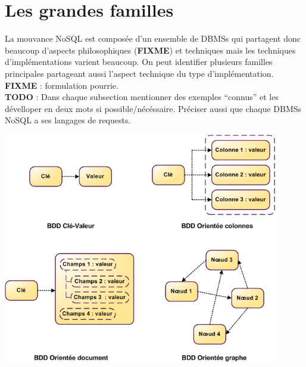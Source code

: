 \documentclass[11pt]{article}
\begin{document}
\section{Les grandes familles} %
La mouvance NoSQL est composée d'un ensemble de DBMSs qui partagent donc beaucoup d'aspects philosophiques (\textbf{FIXME}) et techniques mais les techniques d'implémentations varient beaucoup. On peut identifier plusieurs familles principales partageant aussi l'aspect technique du type d'implémentation. \textbf{FIXME} : formulation pourrie. \\
\textbf{TODO} : Dans chaque subsection mentionner des exemples ``connus'' et les dévelloper en deux mots si possible/nécéssaire. Préciser aussi que chaque DBMSs NoSQL a ses langages de requests.
\begin{center}
  \includegraphics[width=12cm]{nosql.png}
\end{center}
\end{document}
